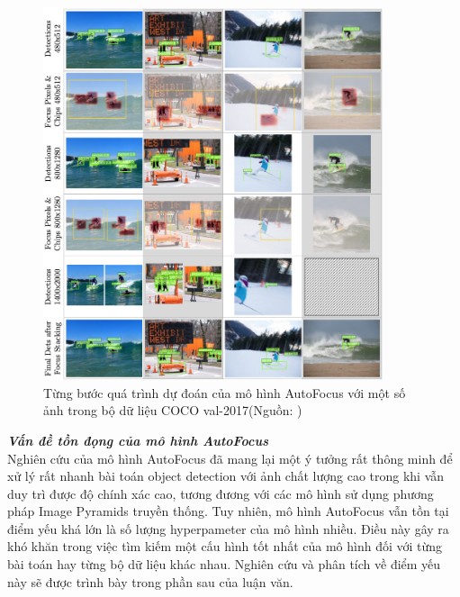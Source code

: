 {    \begin{figure}[H]
        \centering
        \includegraphics[width=10cm] {images/autofocus_results_3}
        \caption{Từng bước quá trình dự đoán của mô hình AutoFocus với một số ảnh trong bộ dữ liệu COCO val-2017(Nguồn: \cite{najibi2019autofocus})}
        \label{fig:autofocus_results_3}
    \end{figure}

    \noindent
    \textbf{\textit{Vấn đề tồn đọng của mô hình AutoFocus}} \\
    Nghiên cứu của mô hình AutoFocus đã mang lại một ý tưởng rất thông minh để xử lý rất nhanh bài toán object detection với ảnh chất lượng cao trong khi vẫn duy trì được độ chính xác cao, tương đương với các mô hình sử dụng phương pháp Image Pyramids truyền thống.
    Tuy nhiên, mô hình AutoFocus vẫn tồn tại điểm yếu khá lớn là số lượng hyperpameter của mô hình nhiều.
    Điều này gây ra khó khăn trong việc tìm kiếm một cấu hình tốt nhất của mô hình đối với từng bài toán hay từng bộ dữ liệu khác nhau.
    Nghiên cứu và phân tích về điểm yếu này sẽ được trình bày trong phần sau của luận văn.
}